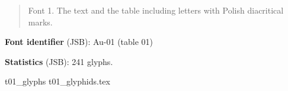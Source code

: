\documentclass[12pt]{article}
\newcommand{\bg}{\begingl}
\begin{document}
\bigskip

      
      \medskip


\newcommand{\exampleEN}[1]{{\Junicode\begin{quote}#1\end{quote}}}

\exampleEN{Font 1. The text and the table including letters with Polish diacritical marks.}



  
  \bigskip
  
\newcommand{\fontID}[2]{{\relsize{1}\Junicode\textbf{Font identifier} (JSB): #1 (table #2)}}


    \fontID{Au-01}{01}

\newcommand{\fontstat}[1]{{\Junicode\textbf{Statistics} (JSB): #1 glyphs.}}

\fontstat{241}

 {t01_glyphs}
 {t01_glyphids.tex}


\newpage

    
\end{document}
